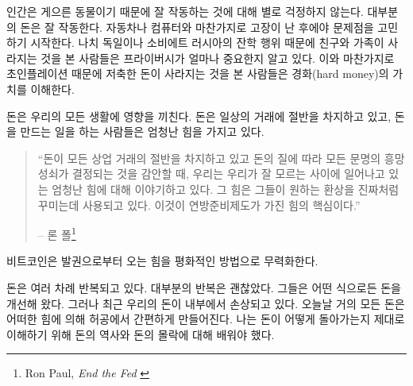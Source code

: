 \begin{comment}
Being the lazy creatures we are, we don't think too much about things
which just work. Money, for most of us, works just fine. Like with our
cars or our computers, most of us are only forced to think about the
inner workings of these things if they break down. People who saw their
life-savings vanish because of hyperinflation know the value of hard
money, just like people who saw their friends and family vanish because
of the atrocities of Nazi Germany or Soviet Russia know the value of
privacy.
\end{comment}
인간은 게으른 동물이기 때문에 잘 작동하는 것에 대해 별로 걱정하지 않는다. 
대부분의 돈은 잘 작동한다.
자동차나 컴퓨터와 마찬가지로 고장이 난 후에야 문제점을 고민하기 시작한다. 
나치 독일이나 소비에트 러시아의 잔학 행위 때문에 친구와 가족이 사라지는 것을 본 사람들은 
프라이버시가 얼마나 중요한지 알고 있다.
이와 마찬가지로 초인플레이션 때문에 저축한 돈이 사라지는 것을 본 사람들은 경화(hard money)의 가치를 이해한다.

\begin{comment}
The thing about money is that it is all-encompassing. Money is half of
every transaction, which imbues the ones who are in charge with creating
money with enormous power.
\end{comment}
돈은 우리의 모든 생활에 영향을 끼친다. 
돈은 일상의 거래에 절반을 차지하고 있고, 
돈을 만드는 일을 하는 사람들은 엄청난 힘을 가지고 있다.
\begin{quotation}\begin{samepage}
\enquote{돈이 모든 상업 거래의 절반을 차지하고 있고
	돈의 질에 따라 모든 문명의 흥망성쇠가 결정되는 것을 감안할 때,
	우리는 우리가 잘 모르는 사이에 일어나고 있는 엄청난 힘에 대해 이야기하고 있다.
	그 힘은 그들이 원하는 환상을 진짜처럼 꾸미는데 사용되고 있다.
	이것이 연방준비제도가 가진 힘의 핵심이다.}
\begin{flushright} -- 론 폴\footnote{Ron Paul, \textit{End the Fed} \cite{end-the-fed}}
\end{flushright}\end{samepage}\end{quotation}

비트코인은 발권으로부터 오는 힘을 평화적인 방법으로 무력화한다. 


\begin{comment}
Money went through multiple iterations. Most iterations were good. They
improved our money in one way or another. Very recently, however, the
inner workings of our money got corrupted. Today, almost all of our
money is simply created \textit{out of thin air} by the powers that be. To
understand how this came to be I had to learn about the history and
subsequent downfall of money.
\end{comment}
돈은 여러 차례 반복되고 있다. 
대부분의 반복은 괜찮았다. 
그들은 어떤 식으로든 돈을 개선해 왔다.
그러나 최근 우리의 돈이 내부에서 손상되고 있다.
오늘날 거의 모든 돈은 어떠한 힘에 의해 허공에서 간편하게 만들어진다.
나는 돈이 어떻게 돌아가는지 제대로 이해하기 위해 돈의 역사와 돈의 몰락에 대해 배워야 했다.

